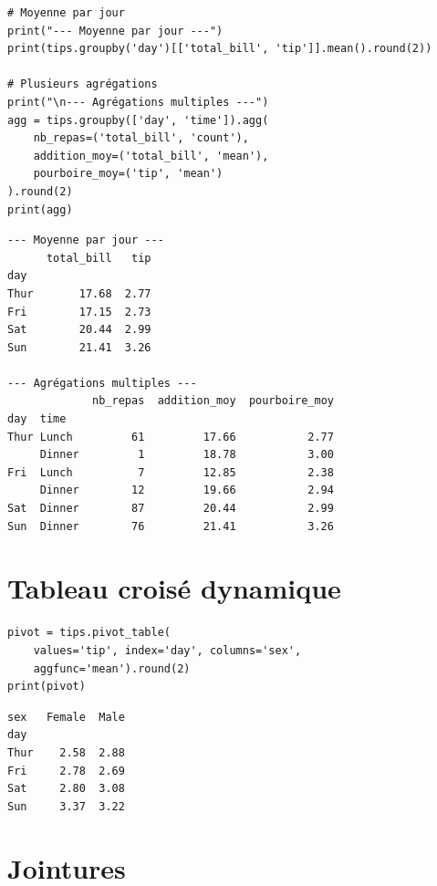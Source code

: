 \begin{codeblock}[title=\textbf{Python --- groupby}]
\begin{verbatim}
# Moyenne par jour
print("--- Moyenne par jour ---")
print(tips.groupby('day')[['total_bill', 'tip']].mean().round(2))

# Plusieurs agrégations
print("\n--- Agrégations multiples ---")
agg = tips.groupby(['day', 'time']).agg(
    nb_repas=('total_bill', 'count'),
    addition_moy=('total_bill', 'mean'),
    pourboire_moy=('tip', 'mean')
).round(2)
print(agg)
\end{verbatim}
\end{codeblock}

\begin{codeoutput}
\begin{verbatim}
--- Moyenne par jour ---
      total_bill   tip
day
Thur       17.68  2.77
Fri        17.15  2.73
Sat        20.44  2.99
Sun        21.41  3.26

--- Agrégations multiples ---
             nb_repas  addition_moy  pourboire_moy
day  time
Thur Lunch         61         17.66           2.77
     Dinner         1         18.78           3.00
Fri  Lunch          7         12.85           2.38
     Dinner        12         19.66           2.94
Sat  Dinner        87         20.44           2.99
Sun  Dinner        76         21.41           3.26
\end{verbatim}
\end{codeoutput}

\section{Tableau crois\'e dynamique}

\begin{codeblock}[title=\textbf{Python --- pivot\_table}]
\begin{verbatim}
pivot = tips.pivot_table(
    values='tip', index='day', columns='sex',
    aggfunc='mean').round(2)
print(pivot)
\end{verbatim}
\end{codeblock}

\begin{codeoutput}
\begin{verbatim}
sex   Female  Male
day
Thur    2.58  2.88
Fri     2.78  2.69
Sat     2.80  3.08
Sun     3.37  3.22
\end{verbatim}
\end{codeoutput}

\section{Jointures}

